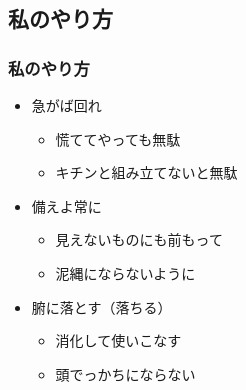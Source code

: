 \documentclass[12pt, dvipdfmx]{beamer}
\begin{document}
\subsection{私のやり方}
\begin{frame}
    \frametitle{私のやり方}
        \begin{itemize}
            \LARGE
            \item 急がば回れ
            \begin{itemize}
                \Large
                \item<2-> 慌ててやっても無駄
                \item<2-> キチンと組み立てないと無駄
            \end{itemize}
            \item 備えよ常に
            \begin{itemize}
                \Large
                \item<3-> 見えないものにも前もって
                \item<3-> 泥縄にならないように
            \end{itemize}
            \item 腑に落とす（落ちる）
            \begin{itemize}
                \Large
                \item<4> 消化して使いこなす
                \item<4> 頭でっかちにならない
            \end{itemize}
        \end{itemize}
\end{frame}
\end{document}
